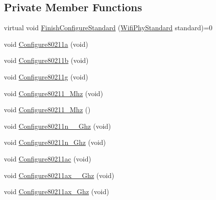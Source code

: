 \subsection*{Private Member Functions}
\begin{DoxyCompactItemize}
\item 
virtual void \hyperlink{classns3_1_1WifiMac_a72260f22e273c8b11aa0453adf092768}{Finish\+Configure\+Standard} (\hyperlink{group__wifi_ga1299834f4e1c615af3ca738033b76a49}{Wifi\+Phy\+Standard} standard)=0
\item 
void \hyperlink{classns3_1_1WifiMac_a943b3ecf94ab4a55fab61b36d2ccd1ea}{Configure80211a} (void)
\item 
void \hyperlink{classns3_1_1WifiMac_a71071ac76d23188d7709bace54639998}{Configure80211b} (void)
\item 
void \hyperlink{classns3_1_1WifiMac_a827eace56408e746fd89edbec397f6c9}{Configure80211g} (void)
\item 
void \hyperlink{classns3_1_1WifiMac_a9c463197da57525dbb5ca3597bf3723f}{Configure80211\+\_\+Mhz} (void)
\item 
void \hyperlink{classns3_1_1WifiMac_acf8a2b425758ad26ffbe32068156a4a0}{Configure80211\+\_\+Mhz} ()
\item 
void \hyperlink{classns3_1_1WifiMac_ab263ee8ba60441bf96a9c9debb0c99e6}{Configure80211n\+\_\+\_\+Ghz} (void)
\item 
void \hyperlink{classns3_1_1WifiMac_ae1407b7d661b9a712bdd95cffbef1e0f}{Configure80211n\+\_\+Ghz} (void)
\item 
void \hyperlink{classns3_1_1WifiMac_ae5ebb39bedd14fbff677b5948d6801ab}{Configure80211ac} (void)
\item 
void \hyperlink{classns3_1_1WifiMac_a244d95e24bc602959e5ef2214d635115}{Configure80211ax\+\_\+\_\+Ghz} (void)
\item 
void \hyperlink{classns3_1_1WifiMac_af0c5ea359558e4a6c83dc91c570f7488}{Configure80211ax\+\_\+Ghz} (void)
\end{DoxyCompactItemize}
